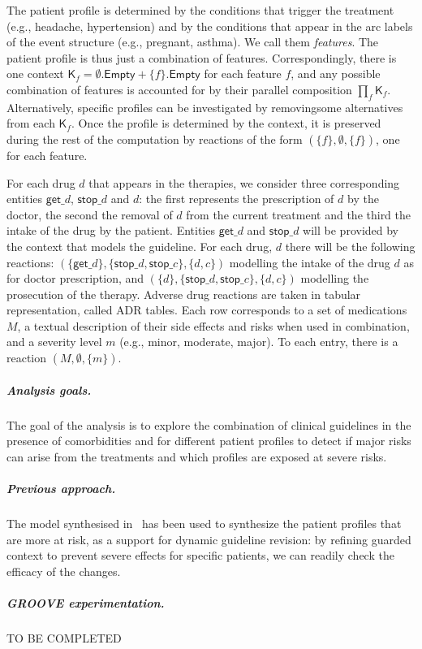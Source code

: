 The patient profile is determined by the conditions that trigger the treatment (e.g., headache, hypertension) and by the conditions that appear in the arc labels of the event structure (e.g., pregnant, asthma). We call them \emph{features}. The patient profile is thus just a combination of features. Correspondingly, there is one context $\mathsf{K}_f = \emptyset.\mathsf{Empty} + \{f\}.\mathsf{Empty}$ for each feature $f$, and any possible combination of features is accounted for by their parallel composition $\prod_f \mathsf{K}_f$. Alternatively, specific profiles can be investigated by removingsome alternatives from each $\mathsf{K}_f$.
Once the profile is determined by the context, it is preserved during the rest of the computation by reactions of the form $(\{f\},\emptyset,\{f\})$, one for each feature.

For each drug $d$ that appears in the therapies, we consider three corresponding entities $\mathsf{get}\_d$, $\mathsf{stop}\_d$  and $d$: the first represents the prescription of $d$ by the doctor, the second the removal of $d$ from the current treatment and the third the intake of the drug by the patient. 
Entities $\mathsf{get}\_d$ and $\mathsf{stop}\_d$ will be provided by the context that models the guideline. 
For each drug, $d$ there will be the following reactions: $(\{\mathsf{get}\_d\},\{\mathsf{stop}\_d,\mathsf{stop}\_c\},\{d,c\})$ modelling the intake of the drug $d$ as for doctor prescription, and $(\{d\},\{\mathsf{stop}\_d,\mathsf{stop}\_c\},\{d,c\})$ modelling the prosecution of the therapy. 
Adverse drug reactions are taken in tabular representation, called ADR tables.
Each row corresponds to a set of medications $M$, a textual description of their side effects and risks when used in combination, and a severity level $m$ (e.g., minor, moderate, major).
To each entry, there is a reaction $(M,\emptyset,\{m\})$. 

\subparagraph*{Analysis goals.}
The goal of the analysis is to explore the combination of clinical guidelines in the presence of comorbidities and for different patient profiles to detect if major risks can arise from the treatments and which profiles are exposed at severe risks.

\subparagraph*{Previous approach.}
The model synthesised in~\cite{DBLP:conf/cmsb/BowlesBBFGM24} has been used to synthesize the patient profiles that are more at risk, as a support for dynamic guideline revision: by refining guarded context to prevent severe effects for specific patients, we can readily check the efficacy of the changes.

\subparagraph*{GROOVE experimentation.}
TO BE COMPLETED



